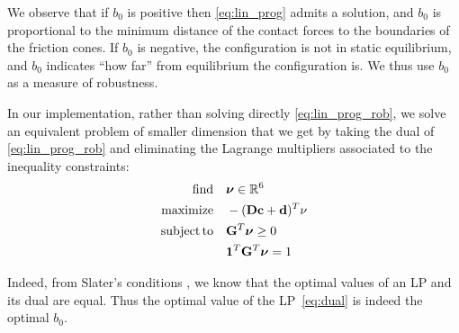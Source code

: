 We observe that if $b_0$ is positive then \eqref{eq:lin_prog} admits a solution, and $b_0$ is proportional to the minimum distance of the contact forces to the boundaries of the friction cones.
If $b_0$ is negative, the configuration is not in static equilibrium, and $b_0$ indicates ``how far'' from equilibrium the configuration is. We thus use $b_0$ as a measure of robustness.

In our implementation, rather than solving directly \eqref{eq:lin_prog_rob}, we solve an equivalent problem of smaller dimension that we get by taking the dual of \eqref{eq:lin_prog_rob} and eliminating the Lagrange multipliers associated to the inequality constraints:
\begin{equation} \label{eq:dual} \begin{aligned}
\find \quad & \bm{\nu} \in \Rv{6}\\
\maximize  \quad & -(\mathbf{D} \mathbf{c} + \mathbf{d})^T \nu \\
\st \quad &\mathbf{G}^T \bm{\nu} \ge 0 \\
& \mathbf{1}^T \mathbf{G}^T \bm{\nu} = 1 \\
\end{aligned} \end{equation}

Indeed, from Slater's conditions \citep{Boyd:2004:CO:993483}, we know that the optimal values of an LP and its dual are equal. Thus the optimal value of the LP~\eqref{eq:dual} is indeed the optimal $b_0$.

